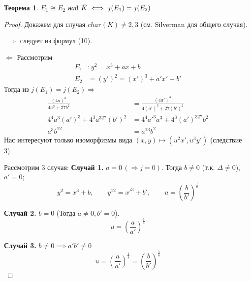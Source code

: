 \documentclass[12pt]{article}
\newtheorem{theorem}{Теорема}
\theoremstyle{definition}
\theoremstyle{definition}
\theoremstyle{definition}
\begin{document}
            \begin{theorem}
                $E_1 \cong E_2$ над $\Bar{K} \iff j(E_1)=j(E_2)$
            \end{theorem}
            \begin{proof}
                Докажем для случая $char(K)\neq 2,3$ (см. Silverman для общего случая).
                
                $\implies$ следует из формул (10).
                
                $\Longleftarrow$ Рассмотрим
                \begin{align*}
                    E_1&:y^2=x^3+ax+b \\
                    E_2&=(y')^2 = (x')^3+a'x'+b'
                \end{align*}
                Тогда из $j(E_1)=j(E_2) \Rightarrow$
                \begin{align*}
                    \frac{(4a)^3}{4a^3+27b^2} &= \frac{(4a')^3}{4(a')^3+27(b')^2} \\
                    4^4a^3(a')^3 + 4^3a^327(b')^2 &= 4^4 a'^3a^3 + 4^3(a')^327b^2 \\
                    a^3b^{12} &= a^{13}b^2 \tag{*}
                \end{align*}
                Нас интересуют только изоморфизмы вида $(x,y)\mapsto(u^2x', u^3y')$ (следствие 3).
                
                Рассмотрим 3 случая: \newline
                \textbf{Случай 1.} $a = 0 \,(\Rightarrow j=0)$. Тогда $b\neq0$ (т.к. $\Delta \neq0$), $a'=0$;
                \begin{equation*}
                    y^2=x^3+b, \quad \quad y^{12} = x'^3 + b', \quad \quad u=(\frac{b}{b'})^{\frac{1}{6}}
                \end{equation*}
                
                \textbf{Случай 2.} $b=0$ (Тогда $a \neq 0, b' = 0$).
                \[
                     u = (\frac{a}{a'})^{\frac{1}{4}}
                \]
                
                \textbf{Случай 3.} $b\neq0 \implies a'b' \neq0$ 
                \[
                    u = (\frac{a}{a'})^{\frac{1}{4}} = (\frac{b}{b'})^{\frac{1}{6}}
                \]
            \end{proof}
            
\end{document}
